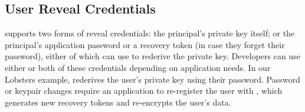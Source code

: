 \subsection{User Reveal Credentials}
%
\sys supports two forms of reveal credentials: \one{} the principal's private key
itself; or \two{} the principal's application password or a recovery
token (in case they forget their password), either of which \sys can use to rederive
the private key.
%
%
%
%
Developers can use either or both of these credentials depending on application needs.
%
In our Lobsters example, \sys rederives the user's private key using their password.
%
%
%
Password or keypair changes require an application to re-register the user with
\sys, which generates new recovery tokens and re-encrypts the user's \xxed data.
%
%
%
%

%
%


